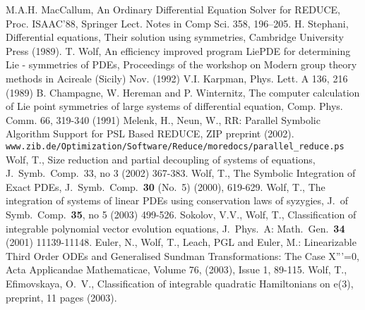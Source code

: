 \documentclass[12pt]{article}
\begin{document}
\begin{thebibliography}{99}
 M.A.H. MacCallum, An Ordinary Differential Equation
Solver for REDUCE, Proc. ISAAC'88, Springer Lect. Notes in Comp Sci.
358, 196--205.
 H. Stephani, Differential equations, Their solution using
symmetries, Cambridge University Press (1989).
 T. Wolf, An efficiency improved program {\sc LiePDE}
for determining Lie - symmetries of PDEs, Proceedings of the workshop on
Modern group theory methods in Acireale (Sicily) Nov. (1992)
 V.I. Karpman, Phys. Lett. A 136, 216 (1989)
 B. Champagne, W. Hereman and P. Winternitz, The computer
      calculation of Lie point symmetries of large systems of differential
      equation, Comp. Phys. Comm. 66, 319-340 (1991)
 Melenk, H., Neun, W., RR: Parallel Symbolic
      Algorithm Support for PSL Based REDUCE, ZIP preprint (2002). \\
{\tt www.zib.de/Optimization/Software/Reduce/moredocs/parallel\_reduce.ps}
Wolf, T., Size reduction and partial decoupling of systems of equations,
          J.\ Symb.\ Comp.\ 33, no 3 (2002) 367-383.
Wolf, T., The Symbolic Integration of Exact PDEs, J.\ Symb.\ Comp.\
          {\bf 30} (No.\ 5) (2000), 619-629.
Wolf, T., The integration of systems of linear PDEs using conservation
          laws of syzygies, J.\ of Symb.\ Comp.\ {\bf 35}, no 5 (2003) 499-526.
\bibitem{SokWol01}
Sokolov, V.V., Wolf, T., Classification of integrable
          polynomial vector evolution equations, J.\ Phys.\ A: Math.\
          Gen.\ {\bf 34} (2001) 11139-11148.
\bibitem{EWLE02}
Euler, N., Wolf, T., Leach, PGL and Euler, M.:
          Linearizable Third Order ODEs and Generalised Sundman
          Transformations: The Case X'''=0, 
          Acta Applicandae Mathematicae, Volume 76, (2003), 
          Issue 1, 89-115.
\bibitem{WolEfi03a}
Wolf, T., Efimovskaya, O.\ V., Classification of integrable
          quadratic Hamiltonians on e(3), preprint, 11 pages (2003). 

\end{thebibliography}
 
\end{document}
